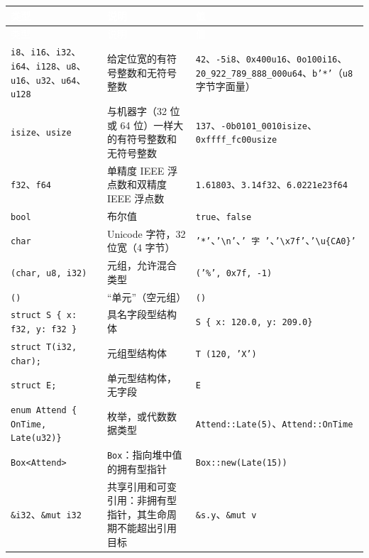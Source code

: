 \myTableBegin
\begin{xltabular}{\textwidth}{@{}>{\hsize\raggedright\arraybackslash}X>{\hsize\raggedright\arraybackslash}X>{\hsize\raggedright\arraybackslash}X@{}}
\textcolor{white}{类型} & \textcolor{white}{说明} & \textcolor{white}{值} \\
\endfirsthead
{}\textcolor{white}{类型} & \textcolor{white}{说明} & \textcolor{white}{值} \\
\endhead
\texttt{i8}、\texttt{i16}、\texttt{i32}、\texttt{i64}、\texttt{i128}、\texttt{u8}、\texttt{u16}、\texttt{u32}、\texttt{u64}、\texttt{u128} & 给定位宽的有符号整数和无符号整数 & \texttt{42}、\texttt{-5i8}、\texttt{0x400u16}、\texttt{0o100i16}、\texttt{20\_922\_789\_888\_000u64}、\texttt{b'*'}（\texttt{u8} 字节字面量） \\
\texttt{isize}、\texttt{usize} & 与机器字（32 位或 64 位）一样大的有符号整数和无符号整数 & \texttt{137}、\texttt{-0b0101\_0010isize}、\texttt{0xffff\_fc00usize} \\
\texttt{f32}、\texttt{f64} & 单精度 IEEE 浮点数和双精度 IEEE 浮点数 & \texttt{1.61803}、\texttt{3.14f32}、\texttt{6.0221e23f64} \\
\texttt{bool} & 布尔值 & \texttt{true}、\texttt{false} \\
\texttt{char} & Unicode 字符，32 位宽（4 字节） & \texttt{'*'}、\texttt{'\textbackslash{}n'}、\texttt{' 字 '}、\texttt{'\textbackslash{}x7f'}、\texttt{'\textbackslash{}u\{CA0\}'} \\
\texttt{(char, u8, i32)} & 元组，允许混合类型 & \texttt{('\%', 0x7f, -1)} \\
\texttt{()} & “单元”（空元组） & \texttt{()} \\
\texttt{struct S \{ x: f32, y: f32 \}} & 具名字段型结构体 & \texttt{S \{ x: 120.0, y: 209.0\}} \\
\texttt{struct T(i32, char);} & 元组型结构体 & \texttt{T (120, 'X')} \\
\texttt{struct E;} & 单元型结构体，无字段 & \texttt{E} \\
\texttt{enum Attend \{ OnTime, Late(u32)\}} & 枚举，或代数数据类型 & \texttt{Attend::Late(5)}、\texttt{Attend::OnTime} \\
\texttt{Box<Attend>} & \texttt{Box}：指向堆中值的拥有型指针 & \texttt{Box::new(Late(15))} \\
\texttt{\&i32}、\texttt{\&mut i32} & 共享引用和可变引用：非拥有型指针，其生命周期不能超出引用目标 & \texttt{\&s.y}、\texttt{\&mut v} \\

\end{xltabular}
